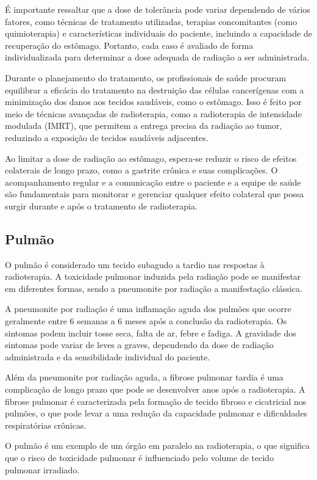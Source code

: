\documentclass[11pt,a4paper]{article}
\newcounter{exemplo}
\begin{document}
	É importante ressaltar que a dose de tolerância pode variar dependendo de vários fatores, como técnicas de tratamento utilizadas, terapias concomitantes (como quimioterapia) e características individuais do paciente, incluindo a capacidade de recuperação do estômago. Portanto, cada caso é avaliado de forma individualizada para determinar a dose adequada de radiação a ser administrada.

	Durante o planejamento do tratamento, os profissionais de saúde procuram equilibrar a eficácia do tratamento na destruição das células cancerígenas com a minimização dos danos aos tecidos saudáveis, como o estômago. Isso é feito por meio de técnicas avançadas de radioterapia, como a radioterapia de intensidade modulada (IMRT), que permitem a entrega precisa da radiação ao tumor, reduzindo a exposição de tecidos saudáveis adjacentes.

	Ao limitar a dose de radiação ao estômago, espera-se reduzir o risco de efeitos colaterais de longo prazo, como a gastrite crônica e suas complicações. O acompanhamento regular e a comunicação entre o paciente e a equipe de saúde são fundamentais para monitorar e gerenciar qualquer efeito colateral que possa surgir durante e após o tratamento de radioterapia.

\subsection*{Pulmão}

	O pulmão é considerado um tecido subagudo a tardio nas respostas à radioterapia. A toxicidade pulmonar induzida pela radiação pode se manifestar em diferentes formas, sendo a pneumonite por radiação a manifestação clássica.

	A pneumonite por radiação é uma inflamação aguda dos pulmões que ocorre geralmente entre 6 semanas a 6 meses após a conclusão da radioterapia. Os sintomas podem incluir tosse seca, falta de ar, febre e fadiga. A gravidade dos sintomas pode variar de leves a graves, dependendo da dose de radiação administrada e da sensibilidade individual do paciente.

	Além da pneumonite por radiação aguda, a fibrose pulmonar tardia é uma complicação de longo prazo que pode se desenvolver anos após a radioterapia. A fibrose pulmonar é caracterizada pela formação de tecido fibroso e cicatricial nos pulmões, o que pode levar a uma redução da capacidade pulmonar e dificuldades respiratórias crônicas.

	O pulmão é um exemplo de um órgão em paralelo na radioterapia, o que significa que o risco de toxicidade pulmonar é influenciado pelo volume de tecido pulmonar irradiado.
\end{document}
